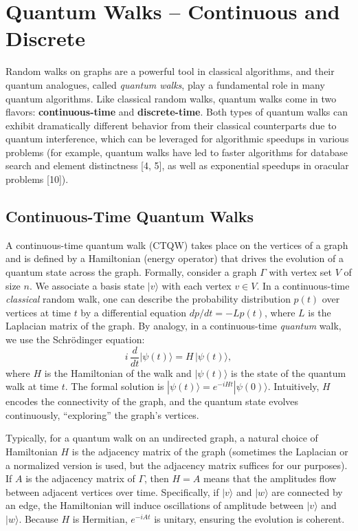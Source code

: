 \documentclass[11pt]{article}
\theoremstyle{definition}
\begin{document}
\chapter{Quantum Walks – Continuous and Discrete}
Random walks on graphs are a powerful tool in classical algorithms, and their quantum analogues, called \emph{quantum walks}, play a fundamental role in many quantum algorithms. Like classical random walks, quantum walks come in two flavors: \textbf{continuous-time} and \textbf{discrete-time}. Both types of quantum walks can exhibit dramatically different behavior from their classical counterparts due to quantum interference, which can be leveraged for algorithmic speedups in various problems (for example, quantum walks have led to faster algorithms for database search and element distinctness [4, 5], as well as exponential speedups in oracular problems [10]).

\section{Continuous-Time Quantum Walks}
A continuous-time quantum walk (CTQW) takes place on the vertices of a graph and is defined by a Hamiltonian (energy operator) that drives the evolution of a quantum state across the graph. Formally, consider a graph $\Gamma$ with vertex set $V$ of size $n$. We associate a basis state $|v\rangle$ with each vertex $v \in V$. In a continuous-time \emph{classical} random walk, one can describe the probability distribution $p(t)$ over vertices at time $t$ by a differential equation $dp/dt = -L p(t)$, where $L$ is the Laplacian matrix of the graph. By analogy, in a continuous-time \emph{quantum} walk, we use the Schrödinger equation:
\[ i\,\frac{d}{dt}|\psi(t)\rangle = H\,|\psi(t)\rangle, \] 
where $H$ is the Hamiltonian of the walk and $|\psi(t)\rangle$ is the state of the quantum walk at time $t$. The formal solution is $|\psi(t)\rangle = e^{-i H t} |\psi(0)\rangle$. Intuitively, $H$ encodes the connectivity of the graph, and the quantum state evolves continuously, “exploring” the graph’s vertices.

Typically, for a quantum walk on an undirected graph, a natural choice of Hamiltonian $H$ is the adjacency matrix of the graph (sometimes the Laplacian or a normalized version is used, but the adjacency matrix suffices for our purposes). If $A$ is the adjacency matrix of $\Gamma$, then $H = A$ means that the amplitudes flow between adjacent vertices over time. Specifically, if $|v\rangle$ and $|w\rangle$ are connected by an edge, the Hamiltonian will induce oscillations of amplitude between $|v\rangle$ and $|w\rangle$. Because $H$ is Hermitian, $e^{-iA t}$ is unitary, ensuring the evolution is coherent.
\end{document}
